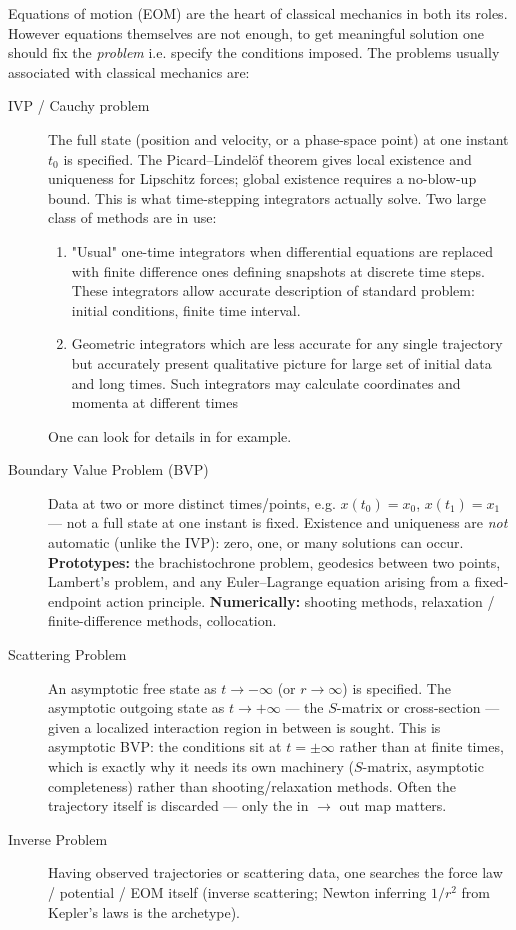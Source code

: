 Equations of motion (EOM) are the heart of classical mechanics in both its roles.
However equations themselves are not enough, to get meaningful solution
one should fix the \emph{problem} i.e. specify the conditions imposed.
The problems usually  associated with classical mechanics are:
\begin{description}
    \item [IVP / Cauchy problem]  The full state (position and velocity, or a
  phase-space point) at one instant $t_0$ is specified.
   The Picard--Lindel\"of theorem gives
  local existence and uniqueness for Lipschitz forces; global existence
  requires a no-blow-up bound.
   This is what time-stepping integrators  actually solve.
    Two large class of methods are in use: 
    \begin{enumerate} 
    \item "Usual" one-time integrators when differential equations are replaced
        with finite difference ones defining snapshots at discrete time steps.
        These integrators allow accurate description of standard problem:
        initial conditions, finite time interval. 
    \item Geometric integrators which are less accurate for any single trajectory
    but accurately present qualitative picture for large set of initial data
        and long times. Such integrators may calculate  coordinates and momenta
        at different times
    \end{enumerate}
    One can look for details in \cite{HairerLubichWanner2006} for example.

    \item [Boundary Value Problem (BVP)] Data at two or more distinct times/points,
  e.g. $x(t_0) = x_0$, $x(t_1) = x_1$ --- not a full state at one
  instant is fixed.
   Existence and uniqueness are \emph{not} automatic (unlike the
  IVP): zero, one, or many solutions can occur.
   \textbf{Prototypes:} the brachistochrone problem, geodesics
  between two points, Lambert's problem, and any Euler--Lagrange
  equation arising from a fixed-endpoint action principle.
   \textbf{Numerically:} shooting methods, relaxation /
  finite-difference methods, collocation.

    \item [Scattering Problem] An asymptotic free state as $t \to
  -\infty$ (or $r \to \infty$) is specified.
   The asymptotic outgoing state as $t \to
  +\infty$ --- the $S$-matrix or cross-section --- given a localized
  interaction region in between is sought.
   This is asymptotic BVP: the conditions sit at $t = \pm\infty$ rather
   than at finite times, which   is exactly why it needs its own machinery 
   ($S$-matrix, asymptotic
  completeness) rather than shooting/relaxation methods.
 Often the trajectory itself is discarded --- only the
  in $\to$ out map matters.

    \item [Inverse Problem] Having observed trajectories or scattering data,
   one searches  the force law / potential / EOM itself
  (inverse scattering; Newton inferring $1/r^2$ from Kepler's laws is
  the archetype).
\end{description}

